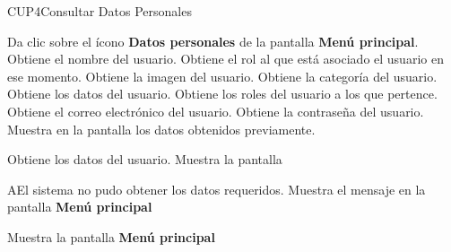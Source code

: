 \begin{UseCase}{CUP4}{Consultar Datos Personales}
{\begin{UClist}
		\end{UClist}		
	}

 \end{UseCase}

 \begin{UCtrayectoria}
 	
 	
 	
 	\UCpaso[\UCactor] Da clic sobre el ícono \textbf{Datos personales} de la pantalla \textbf{Menú principal}. \label{cur:ep}
 	\UCpaso Obtiene el nombre del usuario.
 	\UCpaso Obtiene el rol al que está asociado el usuario en ese momento.
 	\UCpaso Obtiene la imagen del usuario.
 	\UCpaso Obtiene la categoría del usuario.
 	\UCpaso Obtiene los datos del usuario.
 	\UCpaso Obtiene los roles del usuario a los que pertence.
 	\UCpaso Obtiene el correo electrónico del usuario.
 	\UCpaso Obtiene la contraseña del usuario.
 	\UCpaso Muestra en la pantalla los datos obtenidos previamente.
 	
 	\UCpaso Obtiene los datos del usuario.
 	\UCpaso Muestra la pantalla 

 	
    
 \end{UCtrayectoria}

\begin{UCtrayectoriaA}{A}{El sistema no pudo obtener los datos requeridos.}
	\UCpaso Muestra el mensaje  en la pantalla \textbf{Menú principal}
	
	\UCpaso[\UCsist] Muestra la pantalla \textbf{Menú principal}

\end{UCtrayectoriaA}

